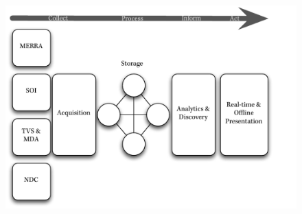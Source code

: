 \begin{figure}[htbp]
    \centering
    \includegraphics[scale=.9]{dataflow}
\end{figure}

\renewcommand\bibname{{References}}


